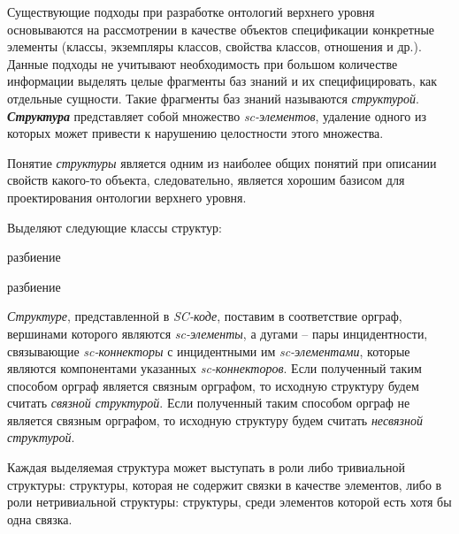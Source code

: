 Существующие подходы при разработке онтологий верхнего уровня основываются на рассмотрении в качестве объектов спецификации конкретные элементы (классы, экземпляры классов, свойства классов, отношения и др.). Данные подходы не учитывают необходимость при большом количестве информации выделять целые фрагменты баз знаний и их специфицировать, как отдельные сущности. Такие фрагменты баз знаний называются \textit{структурой}. \textit{\textbf{Структура}} представляет собой множество \textit{sc-элементов}, удаление одного из которых может привести к нарушению целостности этого множества.

Понятие \textit{структуры} является одним из наиболее общих понятий при описании свойств какого-то объекта, следовательно, является хорошим базисом для проектирования онтологии верхнего уровня.



Выделяют следующие классы структур:
\begin{SCn}
	\begin{scnrelfromset}{разбиение}
\end{scnrelfromset}
	\begin{scnrelfromset}{разбиение}
\end{scnrelfromset}
\end{SCn}

\textit{Структуре}, представленной в \textit{SC-коде}, поставим в соответствие орграф, вершинами которого являются \textit{sc-элементы}, а дугами – пары инцидентности, связывающие \textit{sc-коннекторы} с инцидентными им \textit{sc-элементами}, которые являются компонентами указанных \textit{sc-коннекторов}. Если полученный таким способом орграф является связным орграфом, то исходную структуру будем считать \textit{связной структурой}. Если полученный таким способом орграф не является связным орграфом, то исходную структуру будем считать \textit{несвязной структурой}.

Каждая выделяемая структура может выступать в роли либо тривиальной структуры: структуры, которая не содержит связки в качестве элементов, либо в роли нетривиальной структуры: структуры, среди элементов которой есть хотя бы одна связка.

